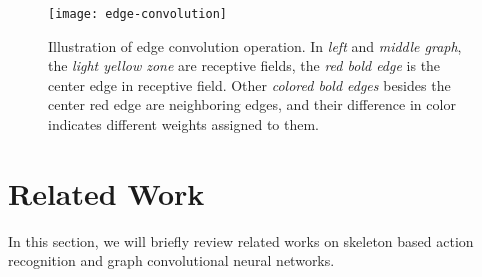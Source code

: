 \documentclass[a4paper,11pt]{article}
\begin{document}
\begin{figure}
\centering
\texttt{[image: edge-convolution]}
\caption{Illustration of edge convolution operation. In {\it left} and {\it middle graph}, the {\it light yellow zone} are receptive fields, the {\it red bold edge} is the center edge in receptive field. Other {\it colored bold edges} besides the {center red edge} are neighboring edges, and their difference in color indicates different weights assigned to them.}
\label{fig:example}
\end{figure}


\section{Related Work}
In this section, we will briefly review related works on skeleton based action recognition and graph convolutional neural networks.
\end{document}

